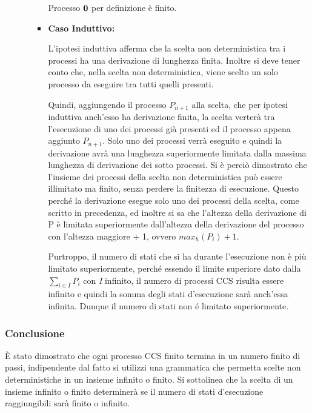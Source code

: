 \begin{itemize}
\begin{itemize}
\begin{itemize}
			Processo $\mathbf{0}$ per definizione è finito.
			\\
			\item[] \textbf{Caso Induttivo:} \mbox{}
			
			L'ipotesi induttiva afferma che la scelta non deterministica tra i processi ha una derivazione di lunghezza finita. Inoltre si deve tener conto che, nella scelta non deterministica, viene scelto un solo processo da eseguire tra tutti quelli presenti.
			
			Quindi, aggiungendo il processo \(P_{n+1}\) alla scelta, che per ipotesi induttiva anch'esso ha derivazione finita, la scelta verterà tra l'esecuzione di uno dei processi già presenti ed il processo appena aggiunto \(P_{n+1}\). Solo uno dei processi verrà eseguito e quindi la derivazione avrà una lunghezza superiormente limitata dalla massima lunghezza di derivazione dei sotto processi. Si è perciò dimostrato che l'insieme dei processi della scelta non deterministica può essere illimitato ma finito, senza perdere la finitezza di esecuzione. Questo perché la derivazione esegue solo uno dei processi della scelta, come scritto in precedenza, ed inoltre si sa che l'altezza della derivazione di P è limitata superiormente dall'altezza della derivazione del processo con l'altezza maggiore + 1, ovvero \(max_h(P_i) + 1\). 
			
			Purtroppo, il numero di stati che si ha durante l'esecuzione non è più limitato superiormente, perché essendo il limite superiore dato dalla  $\displaystyle\sum_{i\in I}^{}P_{i}$ con \textit{I} infinito, il numero di processi CCS risulta essere infinito e quindi la somma degli stati d'esecuzione sarà anch'essa infinita. Dunque il numero di stati non é limitato superiormente.
			
			 
		\end{itemize}
		
	\end{itemize}

\end{itemize}

\subsubsection{Conclusione}
È stato dimostrato che ogni processo CCS finito termina in un numero finito di passi, indipendente dal fatto si utilizzi una grammatica che permetta scelte non deterministiche in un insieme infinito o finito. Si sottolinea che la scelta di un insieme infinito o finito determinerà se il numero di stati d'esecuzione raggiungibili sarà finito o infinito.